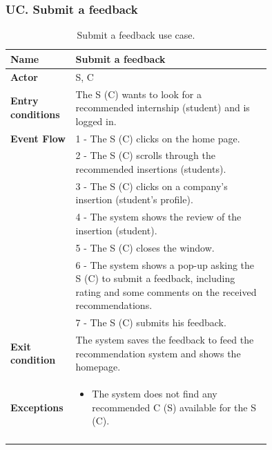 \subsubsection*{UC\cuc . Submit a feedback}
\begin{center}
    \begin{longtable}{|l|p{0.75\linewidth}|}
        \hline
        \textbf{Name}               & Submit a feedback\\
        \hline
        \textbf{Actor}              & S, C\\
        \hline
        \textbf{Entry conditions}   & The S (C) wants to look for a recommended internship (student) and is logged in.\\
        \hline
        \textbf{Event Flow}         & 1 - The S (C) clicks on the home page. \\
        & 2 - The S (C) scrolls through the recommended insertions (students). \\
        & 3 - The S (C) clicks on a company’s insertion (student’s profile). \\
        & 4 - The system shows the review of the insertion (student). \\
        & 5 - The S (C) closes the window. \\
        & 6 - The system shows a pop-up asking the S (C) to submit a feedback, including rating and some comments on the received recommendations. \\
        & 7 - The S (C) submits his feedback. \\
        \hline
        \textbf{Exit condition}   & The system saves the feedback to feed the recommendation system and shows the homepage. \\       
        \hline
        \textbf{Exceptions}       & \begin{itemize}
            \item The system does not find any recommended C (S) available for the S (C).
        \end{itemize}\\
        \hline
        \caption{Submit a feedback use case.}
        \label{tab: submit_feedback_use_case}
    \end{longtable}
\end{center}


